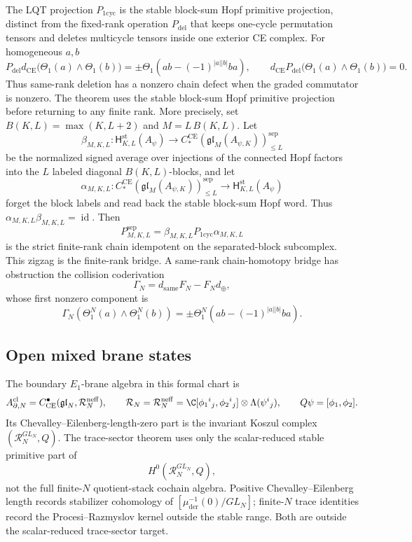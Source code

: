 \documentclass[11pt]{memoir}
\begin{document}
\begin{rmk}\label{rmk:same-rank-vs-LQT}
  The LQT projection \(P_{1\mathrm{cyc}}\) is the stable block-sum
  Hopf primitive projection, distinct from the fixed-rank operation
  \(P_{\mathrm{del}}\) that keeps one-cycle permutation tensors and
  deletes multicycle tensors inside one exterior CE complex.
  For homogeneous \(a,b\)
  \[
    P_{\mathrm{del}}d_{\mathrm{CE}}
    \bigl(\Theta_1(a)\wedge\Theta_1(b)\bigr)
    =
    \pm\Theta_1(ab-(-1)^{|a||b|}ba),
    \qquad
    d_{\mathrm{CE}}P_{\mathrm{del}}
    \bigl(\Theta_1(a)\wedge\Theta_1(b)\bigr)=0 .
  \]
  Thus same-rank deletion has a nonzero chain defect when the graded
  commutator is nonzero.  The theorem uses the stable block-sum Hopf primitive
  projection before returning to any finite rank.  More precisely, set
  \(B(K,L)=\max(K,L+2)\) and \(M=L\,B(K,L)\).  Let
  \[
    \beta_{M,K,L}\colon
    \mathsf H^{\mathrm{st}}_{K,L}(A_\psi)
    \to
    C_*^{\mathrm{CE}}(\mathfrak{gl}_M(A_{\psi,K}))^{\mathrm{sep}}_{\le L}
  \]
  be the normalized signed average over injections of the connected Hopf
  factors into the \(L\) labeled diagonal \(B(K,L)\)-blocks, and let
  \[
    \alpha_{M,K,L}\colon
    C_*^{\mathrm{CE}}(\mathfrak{gl}_M(A_{\psi,K}))^{\mathrm{sep}}_{\le L}
    \to
    \mathsf H^{\mathrm{st}}_{K,L}(A_\psi)
  \]
  forget the block labels and read back the stable block-sum Hopf word.
  Thus \(\alpha_{M,K,L}\beta_{M,K,L}=\operatorname{id}\).
  Then
  \[
    P^{\mathrm{sep}}_{M,K,L}
    =
    \beta_{M,K,L}P_{1\mathrm{cyc}}\alpha_{M,K,L}
  \]
	  is the strict finite-rank chain idempotent on the separated-block
	  subcomplex.  This zigzag is the finite-rank bridge.  A same-rank
	  chain-homotopy bridge has obstruction the collision coderivation
  \[
    \Gamma_N=d_{\mathrm{same}}F_N-F_Nd_{\oplus},
  \]
  whose first nonzero component is
  \[
    \Gamma_N(\Theta_1^N(a)\wedge\Theta_1^N(b))
    =
    \pm\Theta_1^N(ab-(-1)^{|a||b|}ba).
  \]
\end{rmk}

\subsection{Open mixed brane states}\label{ssec:open-mixed-brane-states}

The boundary \(E_1\)-brane algebra in this formal chart is
\[
  A^{\mathrm{cl}}_{\partial,N}
  =
  C^\bullet_{\mathrm{CE}}(\mathfrak{gl}_N,\mathcal R_N^{\mathrm{neff}}),
  \qquad
  \mathcal R_N=\mathcal R_N^{\mathrm{neff}}=
  \C[\phi_1{}^i{}_j,\phi_2{}^i{}_j]\otimes\Lambda(\psi^i{}_j),
  \qquad Q\psi=[\phi_1,\phi_2].
\]
Its Chevalley--Eilenberg-length-zero part is the invariant Koszul
complex \((\mathcal R_N^{GL_N},Q)\).  The trace-sector theorem uses
only the scalar-reduced stable primitive part of
\[
  H^0(\mathcal R_N^{GL_N},Q),
\]
not the full finite-\(N\) quotient-stack cochain algebra.  Positive
Chevalley--Eilenberg length records stabilizer cohomology of
\([\mu^{-1}_{\mathrm{der}}(0)/GL_N]\); finite-\(N\) trace identities
record the Procesi--Razmyslov kernel outside the stable range.  Both
are outside the scalar-reduced trace-sector target.
\end{document}
